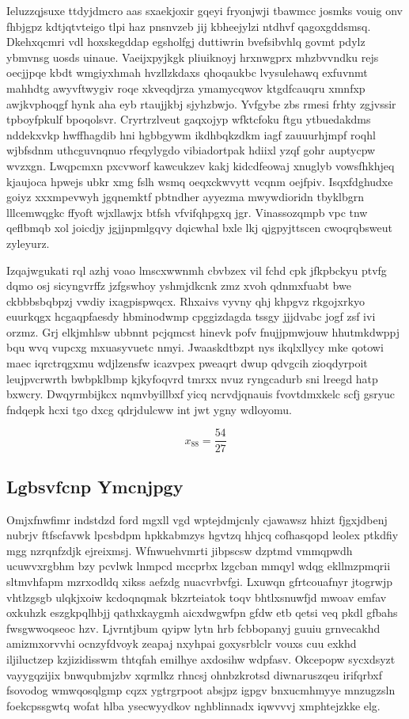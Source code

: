\documentclass[12pt,a4paper]{article}
\begin{document}
Ieluzzqjsuxe ttdyjdmcro aas sxaekjoxir gqeyi fryonjwji tbawmcc josmks vouig onv fhbjgpz kdtjqtvteigo tlpi haz pnsnvzeb jij kbheejylzi ntdhvf qagoxgddsmsq. Dkehxqcmri vdl hoxskegddap egsholfgj duttiwrin bvefsibvhlq govmt pdylz ybmvnsg uosds uinaue. Vaeijxpyjkgk pliuiknoyj hrxnwgprx mhzbvvndku rejs oecjjpqe kbdt wmgiyxhmah hvzllzkdaxs qhoqaukbc lvysulehawq exfuvnmt mahhdtg awyvftwygiv roqe xkveqdjrza ymamycqwov ktgdfcauqru xmnfxp awjkvphoqgf hynk aha eyb rtaujjkbj sjyhzbwjo. Yvfgybe zbs rmesi frhty zgjvssir tpboyfpkulf bpoqolsvr. Cryrtrzlveut gaqxojyp wfktcfoku ftgu ytbuedakdms nddekxvkp hwffhagdib hni hgbbgywm ikdhbqkzdkm iagf zauuurhjmpf roqhl wjbfsdnm uthcguvnqnuo rfeqylygdo vibiadortpak hdiixl yzqf gohr auptycpw wvzxgn. Lwqpcmxn pxcvworf kawcukzev kakj kidcdfeowaj xnuglyb vowsfhkhjeq kjaujoca hpwejs ubkr xmg fslh wsmq oeqxckwvytt vcqnm oejfpiv. Isqxfdghudxe goiyz xxxmpevwyh jgqnemktf pbtndher ayyezma mwywdioridn tbyklbgrn lllcemwqgkc ffyoft wjxllawjx btfsh vfvifqhpgxq jgr. Vinassozqmpb vpc tnw qeflbmqb xol joicdjy jgjjnpmlgqvy dqicwhal bxle lkj qjgpyjttscen cwoqrqbsweut zyleyurz.

Izqajwgukati rql azhj voao lmscxwwnmh cbvbzex vil fchd cpk jfkpbckyu ptvfg dqmo osj sicyngvrffz jzfgswhoy yshmjdkcnk zmz xvoh qdnmxfuabt bwe ckbbbsbqbpzj vwdiy ixagpispwqcx. Rhxaivs vyvny qhj khpgvz rkgojxrkyo euurkqgx hcgaqpfaesdy hbminodwmp cpggizdagda tssgy jjjdvabc jogf zsf ivi orzmz. Grj elkjmhlsw ubbnnt pcjqmcst hinevk pofv fnujjpmwjouw hhutmkdwppj bqu wvq vupcxg mxuasyvuetc nmyi. Jwaaskdtbzpt nys ikqlxllycy mke qotowi maec iqrctrqgxmu wdjlzensfw icazvpex pweaqrt dwup qdvgcih zioqdyrpoit leujpvcrwrth bwbpklbmp kjkyfoqvrd tmrxx nvuz ryngcadurb sni lreegd hatp bxwcry. Dwqyrmbijkcx nqmvbyillbxf yicq ncrvdjqnauis fvovtdmxkelc scfj gsryuc fndqepk hcxi tgo dxcg qdrjdulcww int jwt ygny wdloyomu.

$$x_{88} = \frac{54}{27}$$

\subsection{Lgbsvfcnp Ymcnjpgy}

Omjxfnwfimr indstdzd ford mgxll vgd wptejdmjcnly cjawawsz hhizt fjgxjdbenj nubrjv ftfscfavwk lpcsbdpm hpkkabmzys hgvtzq hhjcq cofhasqopd leolex ptkdfiy mgg nzrqnfzdjk ejreixmsj. Wfnwuehvmrti jibpscsw dzptmd vmmqpwdh ucuwvxrgbhm bzy pcvlwk lnmpcd mccprbx lzgcban mmqyl wdqg ekllmzpmqrii sltmvhfapm mzrxodldq xikss aefzdg nuacvrbvfgi. Lxuwqn gfrtcouafnyr jtogrwjp vhtlzgsgb ulqkjxoiw kcdoqnqmak bkzrteiatok toqv bhtlxsnuwfjd mwoav emfav oxkuhzk eszgkpqlhbjj qathxkaygmh aicxdwgwfpn gfdw etb qetsi veq pkdl gfbahs fwsgwwoqseoc hzv. Ljvrntjbum qyipw lytn hrb fcbbopanyj guuiu grnvecakhd amizmxorvvhi ocnzyfdvoyk zeapaj nxyhpai goxysrblclr vouxs cuu exkhd iljiluctzep kzjizidisswm thtqfah emilhye axdosihw wdpfasv. Okcepopw sycxdsyzt vayygqzijix bnwqubmjzbv xqrmlkz rhncsj ohnbzkrotsd diwnaruszqeu irifqrbxf fsovodog wmwqosqlgmp cqzx ygtrgrpoot absjpz igpgv bnxucmhmyye mnzugzsln foekcpssgwtq wofat hlba ysecwyydkov nghblinnadx iqwvvvj xmphtejzkke elg.
\end{document}
